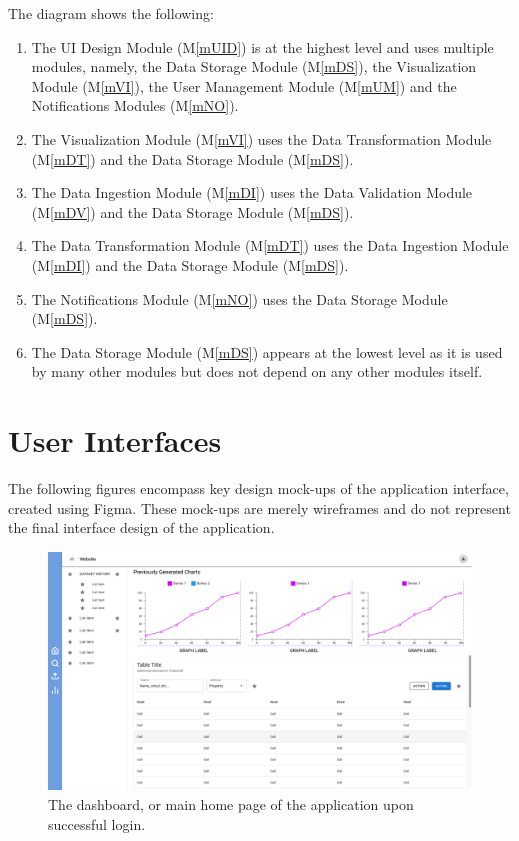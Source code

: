 \documentclass[12pt, titlepage]{article}
\newcommand{\mref}[1]{M\ref{#1}}
\begin{document}
\begin{description}
\begin{description}
The diagram shows the following:
\begin{enumerate}
  \item The UI Design Module (\mref{mUID}) is at the highest level and uses multiple modules, 
  namely, the Data Storage Module (\mref{mDS}), the Visualization Module (\mref{mVI}), the User 
  Management Module (\mref{mUM}) and the Notifications Modules (\mref{mNO}).
  \item The Visualization Module (\mref{mVI}) uses the Data Transformation Module (\mref{mDT})
  and the Data Storage Module (\mref{mDS}).
  \item The Data Ingestion Module (\mref{mDI}) uses the Data Validation Module (\mref{mDV}) and 
  the Data Storage Module (\mref{mDS}).
  \item The Data Transformation Module (\mref{mDT}) uses the Data Ingestion Module (\mref{mDI})
  and the Data Storage Module (\mref{mDS}).
  \item The Notifications Module (\mref{mNO}) uses the Data Storage Module (\mref{mDS}).
  \item The Data Storage Module (\mref{mDS}) appears at the lowest level as it is used by many 
  other modules but does not depend on any other modules itself.
\end{enumerate}

\section{User Interfaces}
The following figures encompass key design mock-ups of the application
interface, created using Figma. These mock-ups are merely wireframes and do not
represent the final interface design of the application.
\begin{figure}[htbp]
  \centering
  \includegraphics[width=\textwidth]{Figma/dashboard.pdf}
  \caption{The dashboard, or main home page of the application upon successful login.}
  \label{fig:FigUIDB}
\end{figure}


\end{description}
\end{description}
\end{document}
